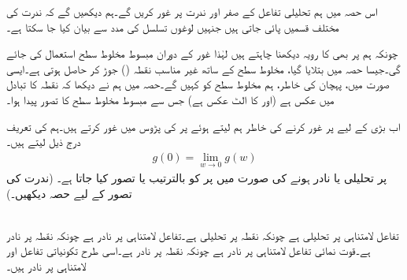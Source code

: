 اس حصہ میں ہم تحلیلی تفاعل کے صفر اور ندرت پر غور کریں گے۔ہم دیکھیں گے کہ ندرت کی مختلف قسمیں پائی جاتی ہیں جنہیں لوغوں تسلسل کی مدد سے بیان کیا جا سکتا ہے۔

چونکہ ہم  پر بھی  کا رویہ دیکھنا چاہتے ہیں لہٰذا غور کے دوران مبسوط مخلوط سطح استعمال کی جائے گی۔جیسا  حصہ  میں بتلایا گیا، مخلوط سطح کے ساتھ غیر مناسب نقطہ  () جوڑ کر  حاصل ہوتی ہے۔ایسی صورت میں، پہچان کی خاطر، ہم مخلوط سطح کو  کہیں گے۔حصہ  میں ہم نے دیکھا کہ  نقطہ  کا تبادل  میں عکس  ہے (اور  کا الٹ عکس  ہے) جس سے مبسوط مخلوط سطح کا تصور پیدا ہوا۔ 

اب  بڑی  کے لیے   پر غور کرنے کی خاطر ہم  لیتے ہوئے  پر  کی پڑوس میں غور کرتے ہیں۔ہم  کی تعریف درج ذیل لیتے ہیں۔
\begin{align}
g(0)=\lim_{w\to 0} g(w)
\end{align}
 پر  تحلیلی یا نادر ہونے کی صورت میں   پر  کو بالترتیب   یا  تصور کیا جاتا ہے۔ (ندرت کی تصور کے لیے حصہ  دیکھیں۔) 

\quad {}\\
تفاعل  لامتناہی پر تحلیلی ہے چونکہ  نقطہ  پر تحلیلی ہے۔تفاعل  لامتناہی پر نادر ہے چونکہ  نقطہ  پر نادر ہے۔قوت نمائی تفاعل  لامتناہی پر نادر ہے چونکہ  نقطہ  پر نادر ہے۔اسی طرح تکونیاتی تفاعل  اور  لامتناہی پر نادر ہیں۔


